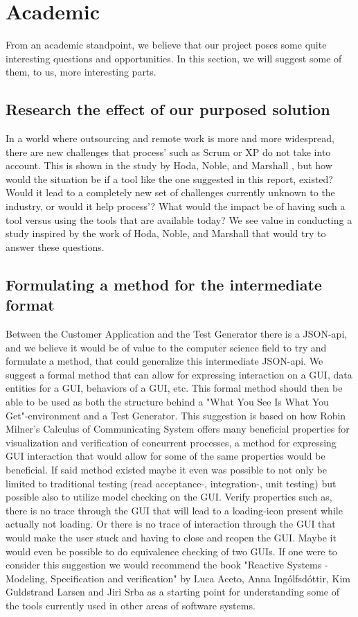 \section{Academic}

From an academic standpoint, we believe that our project poses some quite interesting questions and opportunities.
In this section, we will suggest some of them, to us, more interesting parts.

\subsection{Research the effect of our purposed solution}
In a world where outsourcing and remote work is more and more widespread, there are new challenges that process' such as Scrum or XP do not take into account.
This is shown in the study by Hoda, Noble, and Marshall \cite{Hoda2011TheIO}, but how would the situation be if a tool like the one suggested in this report, existed?
Would it lead to a completely new set of challenges currently unknown to the industry, or would it help process'?
What would the impact be of having such a tool versus using the tools that are available today?
We see value in conducting a study inspired by the work of Hoda, Noble, and Marshall that would try to answer these questions.

\subsection{Formulating a method for the intermediate format}
Between the Customer Application and the Test Generator there is a JSON-api, and we believe it would be of value to the computer science field to try and formulate a method, that could generalize this intermediate JSON-api.
We suggest a formal method that can allow for expressing interaction on a GUI, data entities for a GUI, behaviors of a GUI, etc.
This formal method should then be able to be used as both the structure behind a "What You See Is What You Get"-environment and a Test Generator.
This suggestion is based on how Robin Milner's Calculus of Communicating System offers many beneficial properties for visualization and verification of concurrent processes, a method for expressing GUI interaction that would allow for some of the same properties would be beneficial.
If said method existed maybe it even was possible to not only be limited to traditional testing (read acceptance-, integration-, unit testing) but possible also to utilize model checking on the GUI.
Verify properties such as, there is no trace through the GUI that will lead to a loading-icon present while actually not loading.
Or there is no trace of interaction through the GUI that would make the user stuck and having to close and reopen the GUI.
Maybe it would even be possible to do equivalence checking of two GUIs.
If one were to consider this suggestion we would recommend the book "Reactive Systems - Modeling, Specification and verification" by Luca Aceto, Anna Ingólfsdóttir, Kim Guldstrand Larsen and Jiri Srba as a starting point for understanding some of the tools currently used in other areas of software systems.
